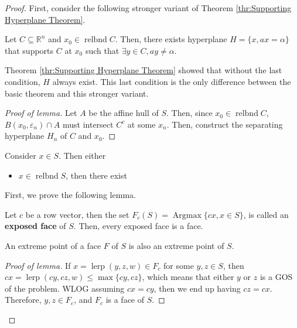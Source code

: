 \begin{proof}

  First, consider the following stronger variant of Theorem \ref{thr:Supporting
  Hyperplane Theorem}.

  \begin{lemma}
  \label{lem:Supporting Hyperplane Theorem (Stronger variant)}

  Let \( C \subseteq \mathbb{R}^{n} \) and \( x_{0} \in \operatorname{relbnd} C \).
  Then, there exists hyperplane \( H = \{x, ax = \alpha\}   \) that supports \(
  C\) at \( x_{0} \) such that \( \exists y \in C, ay \neq  \alpha \).
  \end{lemma}

  Theorem \ref{thr:Supporting Hyperplane Theorem} showed that without the last
  condition, \( H \) always exist. This last condition is the only difference
  between the basic theorem and this stronger variant.

  \begin{proof}[Proof of lemma]
    Let \( A \) be the affine hull of \( S \). Then, since \( x_{0} \in
    \operatorname{relbnd} C \), \( B(x_{0}, \varepsilon_{n}) \cap A  \) must
    intersect \( C^{c} \) at some \( x_{n} \). Then, construct the separating
    hyperplane \( H_{n} \) of \( C \) and \( x_{0} \).
  \end{proof}
  

Consider \( x \in S \). Then either

\begin{itemize}
\item \( x \in \operatorname{relbnd} S \), then there exist 
\end{itemize}

First, we prove the following lemma.

\begin{lemma}
\label{lem:xtreme-pt}
  Let \( c \) be a row vector, then the set \( F_{c}(S) = \operatorname{Argmax}
  \{cx, x \in S\}     \), is called an \textbf{exposed face} of \( S \). Then,
  every exposed face is a face.

  An extreme point of a face \( F \) of \( S \) is also an extreme point of \( S
  \).
\end{lemma}

\begin{proof}[Proof of lemma]
  If \( x = \operatorname{lerp}(y,z, w) \in F_{c} \) for some \( y,z \in S \),
  then \( cx = \operatorname{lerp}(cy, cz, w) \le \max \{cy, cz\}   \), which
  means that either \( y \) or \( z \) is a GOS of the problem. WLOG assuming \(
  cx = cy\), then we end up having \( cz = cx \). Therefore, \( y, z \in F_{c}
  \), and \( F_{c} \) is a face of \( S \).


\end{proof}
\end{proof}
